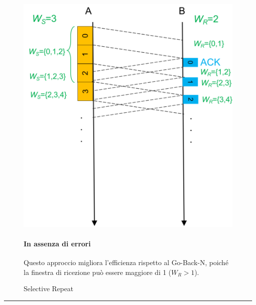         \begin{figure}[htbp]
    \centering
    \begin{minipage}{0.47\textwidth}
        \includegraphics[width=\linewidth]{images/sr.png}
        \caption{Selective Repeat}
        
    \end{minipage}%
    \hfill
    \begin{minipage}{0.48\textwidth}
        \paragraph{In assenza di errori} Questo approccio migliora l'efficienza rispetto al Go-Back-N, poiché la finestra di ricezione può essere maggiore di 1 ($W_R > 1$).

    \end{minipage}
\end{figure}

\vspace{1em}
\noindent\rule{\linewidth}{0.4pt}
\vspace{1em}


